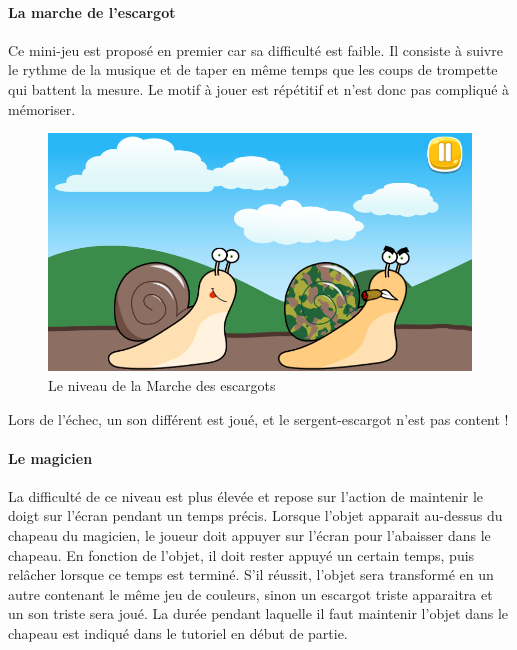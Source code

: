 \paragraph{La marche de l'escargot}

Ce mini-jeu est proposé en premier car sa difficulté est faible. Il consiste à suivre le rythme de la musique et de taper en même temps que les coups de trompette qui battent la mesure. Le motif à jouer est répétitif et n'est donc pas compliqué à mémoriser.

\begin{figure}[H]\centering
  \includegraphics[scale=0.4]{./img/resultat_escargot.png}
  \caption{Le niveau de la Marche des escargots}
  \label{analytics}
\end{figure}

Lors de l'échec, un son différent est joué, et le sergent-escargot n'est pas content !


\paragraph{Le magicien}

La difficulté de ce niveau est plus élevée et repose sur l'action de maintenir le doigt sur l'écran pendant un temps précis. Lorsque l'objet apparait au-dessus du chapeau du magicien, le joueur doit appuyer sur l'écran pour l'abaisser dans le chapeau. En fonction de l'objet, il doit rester appuyé un certain temps, puis relâcher lorsque ce temps est terminé. S'il réussit, l'objet sera transformé en un autre contenant le même jeu de couleurs, sinon un escargot triste apparaitra et un son triste sera joué. La durée pendant laquelle il faut maintenir l'objet dans le chapeau est indiqué dans le tutoriel en début de partie.

